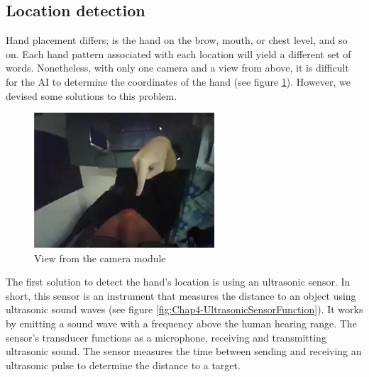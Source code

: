 \subsection{Location detection}

Hand placement differs; is the hand on the brow, mouth, or chest level, and so on. Each hand pattern associated with each location will yield a different set of words. Nonetheless, with only one camera and a view from above, it is difficult for the AI to determine the coordinates of the hand (see figure \ref{fig:Chap4-ViewFromCamera}). However, we devised some solutions to this problem.


\begin{figure}[H]
	\centering
	\includegraphics[width=0.6\textwidth]{img/Chap4/ViewFromCamera.png}
	\caption{View from the camera module}
	\label{fig:Chap4-ViewFromCamera}
\end{figure}


The first solution to detect the hand's location is using an ultrasonic sensor. In short, this sensor is an instrument that measures the distance to an object using ultrasonic sound waves (see figure \ref{fig:Chap4-UltrasonicSensorFunction}). It works by emitting a sound wave with a frequency above the human hearing range. The sensor's transducer functions as a microphone, receiving and transmitting ultrasonic sound. The sensor measures the time between sending and receiving an ultrasonic pulse to determine the distance to a target.


